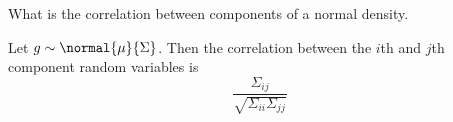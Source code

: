 

What is the correlation between
components of a normal density.


\begin{prop}
Let $g \sim \normal{\mu}{\Sigma}$.
Then the correlation between the $i$th and $j$th component random variables is
\[
  \frac{\Sigma_{ij}}{\sqrt{\Sigma_{ii}\Sigma_{jj}}}
\]
\end{prop}

\blankpage
